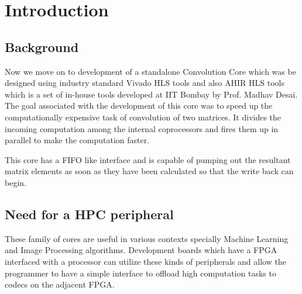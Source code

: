 \chapter{Introduction}

\section*{Background}

Now we move on to development of a standalone Convolution Core which was be designed using industry standard Vivado HLS tools and also AHIR
HLS tools which is a set of in-house tools developed at IIT Bombay by Prof. Madhav Desai. The goal associated with the development of this
core was to speed up the computationally expensive task of convolution of two matrices. It divides the incoming computation among the
internal coprocessors and fires them up in parallel to make the computation faster. 

This core has a FIFO like interface and is capable of pumping out the resultant matrix elements as soon as they have been calculated so that
the write back can begin.

\section*{Need for a HPC peripheral}

These family of cores are useful in various contexts specially Machine Learning and Image Processing algorithms. Development boards which
have a FPGA interfaced with a processor can utilize these kinds of peripherals and allow the programmer to have a simple interface to
offload high computation tasks to codecs on the adjacent FPGA.
